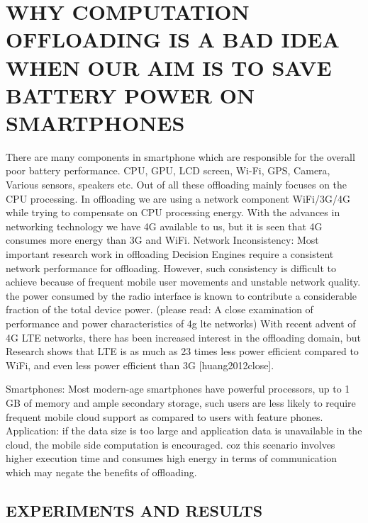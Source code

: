 \documentclass[12pt]{report}
\begin{document}
\chapter{WHY COMPUTATION OFFLOADING IS A BAD IDEA WHEN OUR AIM IS TO SAVE BATTERY POWER ON SMARTPHONES} %
\label{chap:Introduction}
There are many components in smartphone which are responsible for the overall poor battery performance. CPU, GPU, LCD screen, Wi-Fi, GPS, Camera, Various sensors, speakers etc. Out of all these offloading mainly focuses on the CPU processing. In offloading we are using a network component WiFi/3G/4G while trying to compensate on CPU processing energy. With the advances in networking technology we have 4G available to us, but it is seen that 4G consumes more energy than 3G and WiFi.
Network Inconsistency: Most important research work in offloading Decision Engines require a consistent network performance for offloading. However, such consistency is difficult to achieve because of frequent mobile user movements and unstable network quality. the power consumed by the radio interface is known to contribute a considerable fraction of the total device power. (please read: A close examination of performance and power characteristics of 4g lte networks)
With recent advent of 4G LTE networks, there has been increased interest in the offloading domain, but Research shows that LTE is as much as 23 times less power efficient compared to WiFi, and even less power efficient than 3G [huang2012close].

Smartphones: Most modern-age smartphones have powerful processors, up to 1 GB of memory and ample secondary storage, such users are less likely to require frequent mobile cloud support as compared to users with feature phones. 
Application: if the data size is too large and application data is unavailable in the cloud, the mobile side computation is encouraged. coz this scenario involves higher execution time and consumes high energy in terms of communication which may negate the benefits of offloading.

\section{EXPERIMENTS AND RESULTS}
\end{document}
